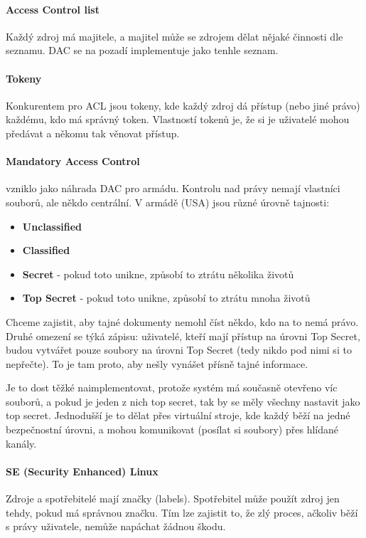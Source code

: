 \paragraph{Access Control list} Každý zdroj má majitele, a majitel může se zdrojem dělat nějaké činnosti dle seznamu. DAC se na pozadí implementuje jako tenhle seznam.

\paragraph{Tokeny} Konkurentem pro ACL jsou tokeny, kde každý zdroj dá přístup (nebo jiné právo) každému, kdo má správný token. Vlastností tokenů je, že si je uživatelé mohou předávat a někomu tak věnovat přístup.

\paragraph{Mandatory Access Control} vzniklo jako náhrada DAC pro armádu. Kontrolu nad právy nemají vlastníci souborů, ale někdo centrální. V armádě (USA) jsou různé úrovně tajnosti:

\begin{itemize}
\item \textbf{Unclassified}
\item \textbf{Classified}
\item \textbf{Secret} - pokud toto unikne, způsobí to ztrátu několika životů
\item \textbf{Top Secret} - pokud toto unikne, způsobí to ztrátu mnoha životů
\end{itemize}

Chceme zajistit, aby tajné dokumenty nemohl číst někdo, kdo na to nemá právo. Druhé omezení se týká zápisu: uživatelé, kteří mají přístup na úrovni Top Secret, budou vytvářet pouze soubory na úrovni Top Secret (tedy nikdo pod nimi si to nepřečte). To je tam proto, aby nešly vynášet přísně tajné informace.

Je to dost těžké naimplementovat, protože systém má současně otevřeno víc souborů, a pokud je jeden z nich top secret, tak by se měly všechny nastavit jako top secret. Jednodušší je to dělat přes virtuální stroje, kde každý běží na jedné bezpečnostní úrovni, a mohou komunikovat (posílat si soubory) přes hlídané kanály.

\paragraph{SE (Security Enhanced) Linux} Zdroje a spotřebitelé mají značky (labels). Spotřebitel může použít zdroj jen tehdy, pokud má správnou značku. Tím lze zajistit to, že zlý proces, ačkoliv běží s právy uživatele, nemůže napáchat žádnou škodu.

